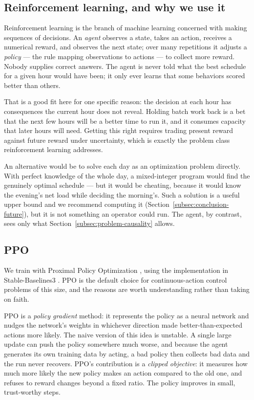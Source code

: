 ﻿\documentclass[12pt]{article}
\begin{document}
\subsection{Reinforcement learning, and why we use it}
\label{subsec:objective-rl}

Reinforcement learning is the branch of machine learning concerned with making
sequences of decisions. An \emph{agent} observes a state, takes an action,
receives a numerical reward, and observes the next state; over many repetitions
it adjusts a \emph{policy} --- the rule mapping observations to actions --- to
collect more reward. Nobody supplies correct answers. The agent is never told
what the best schedule for a given hour would have been; it only ever learns
that some behaviors scored better than others.

That is a good fit here for one specific reason: the decision at each hour has
consequences the current hour does not reveal. Holding batch work back is a bet
that the next few hours will be a better time to run it, and it consumes
capacity that later hours will need. Getting this right requires trading present
reward against future reward under uncertainty, which is exactly the problem
class reinforcement learning addresses.

An alternative would be to solve each day as an optimization problem directly.
With perfect knowledge of the whole day, a mixed-integer program would find the
genuinely optimal schedule --- but it would be cheating, because it would know
the evening's net load while deciding the morning's. Such a solution is a useful
upper bound and we recommend computing it (Section~\ref{subsec:conclusion-future}),
but it is not something an operator could run. The agent, by contrast, sees only
what Section~\ref{subsec:problem-causality} allows.

\subsection{PPO}
\label{subsec:objective-ppo}

We train with Proximal Policy Optimization \cite{schulman2017ppo}, using the
implementation in Stable-Baselines3 \cite{raffin2021sb3}. PPO is the default
choice for continuous-action control problems of this size, and the reasons are
worth understanding rather than taking on faith.

PPO is a \emph{policy gradient} method: it represents the policy as a neural
network and nudges the network's weights in whichever direction made
better-than-expected actions more likely. The naive version of this idea is
unstable. A single large update can push the policy somewhere much worse, and
because the agent generates its own training data by acting, a bad policy then
collects bad data and the run never recovers. PPO's contribution is a
\emph{clipped objective}: it measures how much more likely the new policy makes
an action compared to the old one, and refuses to reward changes beyond a fixed
ratio. The policy improves in small, trust-worthy steps.
\end{document}
